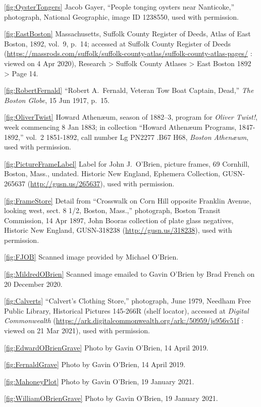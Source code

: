 \ref{fig:OysterTongers} Jacob Gayer, ``People tonging oysters near Nanticoke,'' photograph, National Geographic, image ID 1238550, used with permission.

\ref{fig:EastBoston} Massachusetts, Suffolk County Register of Deeds, Atlas of East Boston, 1892, vol.\ 9, p.\ 14; accessed at Suffolk County Register of Deeds (\url{https://massrods.com/suffolk/suffolk-county-atlas/suffolk-county-atlas-pages/} : viewed on 4 Apr 2020), Research > Suffolk County Atlases > East Boston 1892 > Page 14.

\ref{fig:RobertFernald} ``Robert A.\ Fernald, Veteran Tow Boat Captain, Dead,'' \textit{The Boston Globe}, 15 Jun 1917, p.\ 15.

\ref{fig:OliverTwist}
Howard Athen\ae um, season of 1882--3, program for \textit{Oliver Twist!}, week commencing 8 Jan 1883; in collection ``Howard Athen\ae um Programs, 1847-1892,'' vol.\ 2 1851-1892, call number Lg PN2277 .B67 H68, \textit{Boston Athen\ae um}, used with permission.

\ref{fig:PictureFrameLabel} Label for John J.\ O'Brien, picture frames, 69 Cornhill, Boston, Mass., undated. Historic New England, Ephemera Collection, GUSN-265637 (\url{http://gusn.us/265637}), used with permission.

\ref{fig:FrameStore} Detail from ``Crosswalk on Corn Hill opposite Franklin Avenue, looking west, sect. 8 1/2, Boston, Mass.,'' photograph, Boston Transit Commission, 14 Apr 1897, John Booras collection of plate glass negatives, Historic New England, GUSN-318238 (\url{http://gusn.us/318238}), used with permission. 

\ref{fig:FJOB} Scanned image provided by Michael O'Brien.

\ref{fig:MildredOBrien} Scanned image emailed to Gavin O'Brien by Brad French on 20 December 2020.

\ref{fig:Calverts} ``Calvert's Clothing Store,'' photograph, June 1979, Needham Free Public Library, Historical Pictures 145-266R (shelf locator), accessed at \textit{Digital Commonwealth} (\url{https://ark.digitalcommonwealth.org/ark:/50959/js956v51f} : viewed on 21 Mar 2021), used with permission.

\ref{fig:EdwardOBrienGrave} Photo by Gavin O'Brien, 14 April 2019.

\ref{fig:FernaldGrave} Photo by Gavin O'Brien, 14 April 2019.

\ref{fig:MahoneyPlot} Photo by Gavin O'Brien, 19 January 2021.

\ref{fig:WilliamOBrienGrave} Photo by Gavin O'Brien, 19 January 2021.